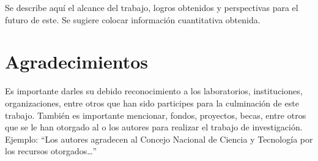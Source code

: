     Se describe aquí el alcance del trabajo, logros obtenidos y perspectivas para el futuro de este. Se sugiere colocar información cuantitativa obtenida.
    
    \section{Agradecimientos}
    
    Es importante darles su debido reconocimiento a los laboratorios, instituciones, organizaciones, entre otros que han sido participes para la culminación de este trabajo. También es importante mencionar, fondos, proyectos, becas, entre otros que se le han otorgado al o los autores para realizar el trabajo de investigación. Ejemplo: “Los autores agradecen al Concejo Nacional de Ciencia y Tecnología por los recursos otorgados…”
    
    
    
    
